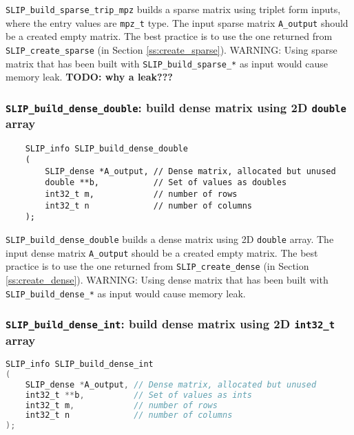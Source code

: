 \documentclass[12pt]{article}
\theoremstyle{definition}
\begin{document}
\verb|SLIP_build_sparse_trip_mpz| builds a sparse matrix using triplet form
inputs, where the entry values are \verb|mpz_t| type. The input sparse matrix
\verb|A_output| should be a created empty matrix. The best practice is to use
the one returned from \verb|SLIP_create_sparse| (in Section
\ref{ss:create_sparse}). WARNING: Using sparse matrix that has been built with
\verb|SLIP_build_sparse_*| as input would cause memory leak.
{\bf TODO: why a leak???} %

\cprotect\subsubsection{\verb|SLIP_build_dense_double|: build dense matrix using 2D \verb|double| array}
\label{s:user:build_dense_double}

\begin{mdframed}[userdefinedwidth=6in]
{\footnotesize
\begin{verbatim}
    SLIP_info SLIP_build_dense_double
    (
        SLIP_dense *A_output, // Dense matrix, allocated but unused
        double **b,           // Set of values as doubles
        int32_t m,            // number of rows
        int32_t n             // number of columns
    );
\end{verbatim}
} \end{mdframed}

\verb|SLIP_build_dense_double| builds a dense matrix using 2D \verb|double|
array. The input dense matrix \verb|A_output| should be a created empty matrix.
The best practice is to use the one returned from \verb|SLIP_create_dense| (in
Section \ref{ss:create_dense}). WARNING: Using dense matrix that has been built
with \verb|SLIP_build_dense_*| as input would cause memory leak.

\cprotect\subsubsection{\verb|SLIP_build_dense_int|: build dense matrix using 2D \verb|int32_t| array}\label{s:user:build_dense_int}
\begin{lstlisting}[language=C,frame=single]
SLIP_info SLIP_build_dense_int
(
    SLIP_dense *A_output, // Dense matrix, allocated but unused
    int32_t **b,          // Set of values as ints
    int32_t m,            // number of rows
    int32_t n             // number of columns
);
\end{lstlisting}
\end{document}
